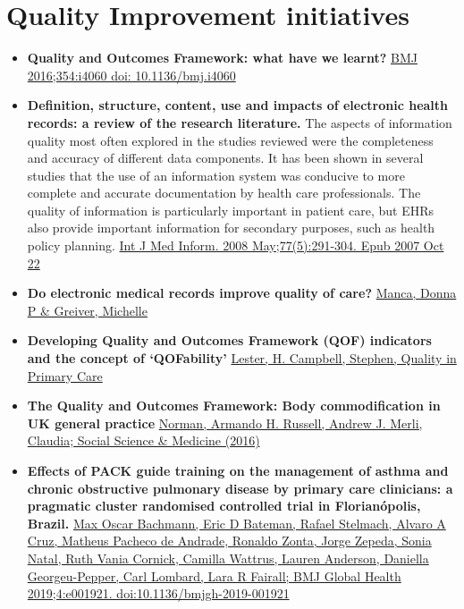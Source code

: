 \documentclass[]{book}
\begin{document}
\hypertarget{quality-improvement-initiatives}{%
\section*{Quality Improvement initiatives}\label{quality-improvement-initiatives}}

\begin{itemize}
\item
  \textbf{Quality and Outcomes Framework: what have we learnt?} \href{https://www.bmj.com/content/bmj/354/bmj.i4060.full.pdf}{BMJ 2016;354:i4060 doi: 10.1136/bmj.i4060}
\item
  \textbf{Definition, structure, content, use and impacts of electronic health records: a review of the research literature.} The aspects of information quality most often explored in the studies reviewed were the completeness and accuracy of different data components. It has been shown in several studies that the use of an information system was conducive to more complete and accurate documentation by health care professionals. The quality of information is particularly important in patient care, but EHRs also provide important information for secondary purposes, such as health policy planning. \href{https://sci-hub.tw/10.1016/j.ijmedinf.2007.09.001}{Int J Med Inform. 2008 May;77(5):291-304. Epub 2007 Oct 22}
\item
  \textbf{Do electronic medical records improve quality of care?} \href{Canadian\%20Family\%20Physician\%20•\%20Le\%20Médecin\%20de\%20famille\%20canadien\%20\%7C\%20Vol\%2061:\%20october\%20•\%20octobre\%202015}{Manca, Donna P \& Greiver, Michelle}
\item
  \textbf{Developing Quality and Outcomes Framework (QOF) indicators and the concept of `QOFability'} \href{http://primarycare.imedpub.com/developing-quality-and-outcomes-framework-qof-indicators-and-the-concept-of-qofability.php?aid=902}{Lester, H. Campbell, Stephen, Quality in Primary Care}
\item
  \textbf{The Quality and Outcomes Framework: Body commodification in UK general practice} \href{https://sci-hub.tw/10.1016/j.socscimed.2016.10.009}{Norman, Armando H. Russell, Andrew J. Merli, Claudia; Social Science \& Medicine (2016)}
\item
  \textbf{Effects of PACK guide training on the management of asthma and chronic obstructive pulmonary disease by primary care clinicians: a pragmatic cluster randomised controlled trial in Florianópolis, Brazil.} \href{file:///C:/Users/Adelson/Downloads/e001921.full.pdf}{Max Oscar Bachmann, Eric D Bateman, Rafael Stelmach, Alvaro A Cruz, Matheus Pacheco de Andrade, Ronaldo Zonta, Jorge Zepeda, Sonia Natal, Ruth Vania Cornick, Camilla Wattrus, Lauren Anderson, Daniella Georgeu-Pepper, Carl Lombard, Lara R Fairall; BMJ Global Health 2019;4:e001921. doi:10.1136/bmjgh-2019-001921}
\end{itemize}
\end{document}
